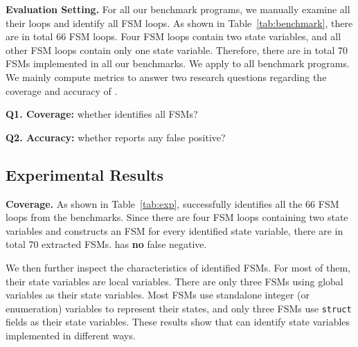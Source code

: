 \noindent\textbf{Evaluation Setting.}
For all our benchmark programs, we manually examine all their loops and
identify all FSM loops.
As shown in Table~\ref{tab:benchmark}, there are in
total 66 FSM loops.
Four FSM loops contain two state variables,
and all other FSM loops contain only one state variable.
Therefore, there are in total 70 FSMs implemented in all our benchmarks.
We apply \Tool{} to all benchmark programs.
We mainly compute metrics to answer two research
questions regarding the coverage and accuracy of \Tool{}.

\noindent\textbf{Q1. Coverage:} whether \Tool{} identifies all FSMs?

\noindent\textbf{Q2. Accuracy:} whether \Tool{} reports any false positive?

\subsection{Experimental Results}
\label{sec:results}



\noindent\textbf{Coverage.}
As shown in Table~\ref{tab:exp}, \Tool{} successfully identifies
all the 66 FSM loops
from the benchmarks. Since there are four FSM loops containing
two state variables and \Tool{} constructs an FSM for every identified state variable,
there are in total 70 extracted FSMs.
\Tool{} has \textbf{no} false negative.



We then further inspect the characteristics of identified FSMs.
For most of them, their state variables are local variables.
There are only three FSMs using global variables as their state variables.
Most FSMs use standalone integer (or enumeration) variables to represent their states,
and only three FSMs use \texttt{struct} fields as their state variables.
These results show that \Tool{} can identify 
state variables implemented in different ways.



